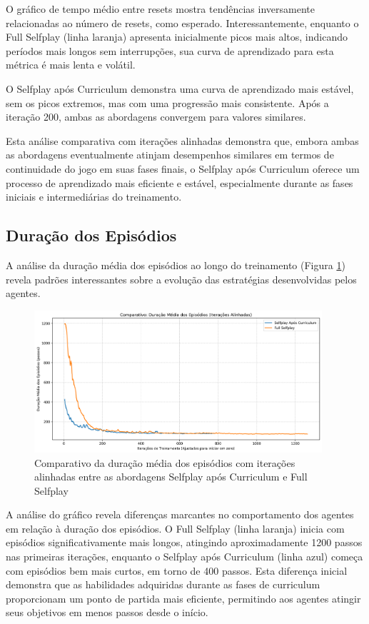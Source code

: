 O gráfico de tempo médio entre resets mostra tendências inversamente relacionadas ao número de resets, como esperado. Interessantemente, enquanto o Full Selfplay (linha laranja) apresenta inicialmente picos mais altos, indicando períodos mais longos sem interrupções, sua curva de aprendizado para esta métrica é mais lenta e volátil.

O Selfplay após Curriculum demonstra uma curva de aprendizado mais estável, sem os picos extremos, mas com uma progressão mais consistente. Após a iteração 200, ambas as abordagens convergem para valores similares.

Esta análise comparativa com iterações alinhadas demonstra que, embora ambas as abordagens eventualmente atinjam desempenhos similares em termos de continuidade do jogo em suas fases finais, o Selfplay após Curriculum oferece um processo de aprendizado mais eficiente e estável, especialmente durante as fases iniciais e intermediárias do treinamento.

\subsection{Duração dos Episódios}

A análise da duração média dos episódios ao longo do treinamento (Figura \ref{fig:episode_len}) revela padrões interessantes sobre a evolução das estratégias desenvolvidas pelos agentes.

\begin{figure}[H]
    \centering
    \includegraphics[width=0.95\textwidth]{fig/graficos_trabalho/graficos_experimentos/geral/comparativo_duracao_episodios_alinhado.png}
    \caption{Comparativo da duração média dos episódios com iterações alinhadas entre as abordagens Selfplay após Curriculum e Full Selfplay}
    \label{fig:episode_len}
\end{figure}

A análise do gráfico revela diferenças marcantes no comportamento dos agentes em relação à duração dos episódios. O Full Selfplay (linha laranja) inicia com episódios significativamente mais longos, atingindo aproximadamente 1200 passos nas primeiras iterações, enquanto o Selfplay após Curriculum (linha azul) começa com episódios bem mais curtos, em torno de 400 passos. Esta diferença inicial demonstra que as habilidades adquiridas durante as fases de curriculum proporcionam um ponto de partida mais eficiente, permitindo aos agentes atingir seus objetivos em menos passos desde o início.

